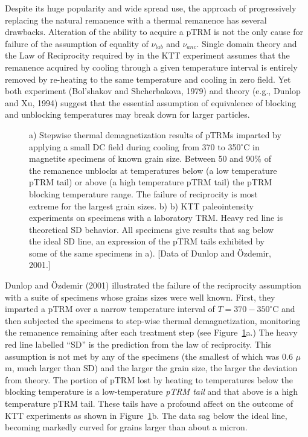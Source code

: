 Despite its huge popularity and wide spread use, the  approach of progressively replacing the natural remanence with a thermal remanence has several drawbacks.  Alteration of the ability to acquire a pTRM is not the only cause for failure of the assumption of equality of $\nu_{lab}$ and $\nu_{anc}$.  Single domain theory and the Law of Reciprocity required by in the KTT experiment assumes that the remanence acquired by cooling through a given  temperature interval is entirely removed by re-heating to the same temperature and cooling in zero field.   Yet both  experiment 
(Bol'shakov and Shcherbakova, 1979) \nocite{bolshakov79} and theory 
(e.g., Dunlop and Xu, 1994) \nocite{dunlop94} suggest that the essential assumption of equivalence of blocking and unblocking temperatures may break down for larger particles.   

\begin{figure}
\epsfxsize 16cm
\centering {}
\caption{ a) Stepwise thermal demagnetization results of pTRMs imparted  by applying a  small DC field during cooling from 370 to 350$^{\circ}$C in magnetite specimens of known grain size.  
Between  50 and 90\% of the remanence unblocks at temperatures below (a low temperature pTRM tail) or above (a high temperature pTRM tail)  the pTRM blocking
temperature range.  The failure of reciprocity  is most extreme for the largest grain sizes.   b)   b) KTT  paleointensity experiments on specimens with a  laboratory TRM.  Heavy red line is theoretical SD behavior.   All specimens give results that sag below the ideal SD line, an expression of the pTRM tails exhibited by some of the same specimens in a).   [Data of Dunlop and \"Ozdemir, 2001.] }
\label{fig:dunlop01}
\end{figure} \nocite{dunlop01}


Dunlop and \"Ozdemir (2001)   illustrated the failure of the  reciprocity assumption with a suite of specimens whose grains sizes were well known.  First, they  imparted a pTRM over a narrow temperature interval of $T=370-350^{\circ}$C and  then subjected the specimens to step-wise thermal demagnetization, monitoring the remanence remaining after each treatment step (see Figure~\ref{fig:dunlop01}a.)    The heavy red line labelled ``SD'' is the prediction from the law of reciprocity.  This assumption is not met by any of the specimens (the smallest of which was 0.6 $\mu$m,  much larger than SD) and the larger the grain size, the larger the deviation from theory.   The portion of pTRM lost by heating to temperatures below the blocking temperature is a low-temperature 
{\it pTRM tail}  and that above is a high temperature pTRM tail.     These tails have a profound affect on the outcome of KTT experiments as shown in Figure~\ref{fig:dunlop01}b.    The data sag below the ideal line, becoming markedly curved for  grains larger than about a micron.   


